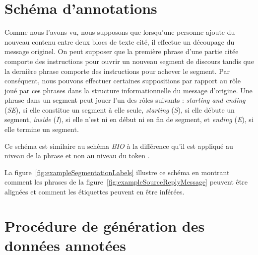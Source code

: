 \section{Schéma d'annotations}

Comme nous l'avons vu, nous supposons que lorsqu'une personne ajoute du nouveau contenu entre deux blocs de texte cité, il effectue un découpage du message originel. On peut supposer que la première phrase d'une partie citée comporte des instructions pour ouvrir un nouveau segment de discours tandis que la dernière phrase comporte des instructions pour achever le segment. Par conséquent, nous pouvons effectuer certaines suppositions par rapport au rôle joué par ces phrases dans la structure informationnelle du message d'origine. Une phrase dans un segment peut jouer l'un des rôles suivants : \emph{starting and ending} (\textit{SE}), si elle constitue un segment à elle seule, \emph{starting} (\textit{S}), si elle débute un segment, \emph{inside} (\textit{I}), si elle n'est ni en début ni en fin de segment, et \emph{ending} (\textit{E}), si elle termine un segment.

Ce schéma est similaire au schéma \emph{BIO} à la différence qu'il est appliqué au niveau de la phrase et non au niveau du token \cite{ratinov:2009:conll}.

La figure~\ref{fig:exampleSegmentationLabels} illustre ce schéma en montrant comment les phrases de la figure~\ref{fig:exampleSourceReplyMessage} peuvent être alignées et comment les étiquettes peuvent en être inférées.

\section{Procédure de génération des données annotées}

